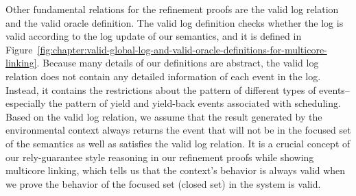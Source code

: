 Other fundamental relations for the refinement proofs are the valid log relation and the valid oracle definition.
The valid log definition checks whether the log is valid according to the log update of our semantics, and it
is defined in Figure~\ref{fig:chapter:valid-global-log-and-valid-oracle-definitions-for-multicore-linking}.
Because many details of our definitions are abstract, the valid log relation does not contain any detailed information 
of each event in the log.
Instead, it contains the restrictions about the pattern of different types of events--especially  the pattern of yield and  yield-back events associated with scheduling.
Based on the valid log relation, 
we assume that the result generated by the environmental context always returns the event that 
will not be in the focused set of the semantics as well as satisfies the valid log relation.
It is a crucial concept of our rely-guarantee style reasoning in our refinement proofs while showing multicore linking, which tells us that the context's behavior is always valid when we prove the behavior of the focused set (closed set) in the system is valid. 


